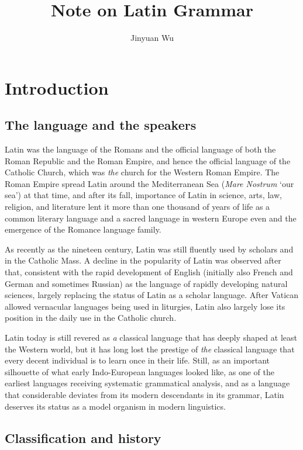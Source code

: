 \documentclass[a4paper, oneside, 12pt]{report}
\title{Note on Latin Grammar}
\author{Jinyuan Wu}
\newcommand{\form}[1]{\emph{#1}}
\newcommand{\translate}[1]{`#1'}
\begin{document}
\automath

\maketitle

\chapter{Introduction}

\section{The language and the speakers}

Latin was the language of the Romans
and the official language of both the Roman Republic and the Roman Empire,
and hence the official language of the Catholic Church, 
which was \emph{the} church for the Western Roman Empire. 
The Roman Empire spread Latin around the Mediterranean Sea (\form{Mare Nostrum} \translate{our sea}) at that time,
and after its fall, 
importance of Latin in science, arts, law, religion, and literature 
lent it more than one thousand of years of life 
as a common literary language and a sacred language in western Europe
even and the emergence of the Romance language family.

As recently as the nineteen century,
Latin was still fluently used by scholars and in the Catholic Mass. 
A decline in the popularity of Latin was observed after that,
consistent with the rapid development of English
(initially also French and German and sometimes Russian)
as the language of rapidly developing natural sciences,
largely replacing the status of Latin as a scholar language.
After Vatican allowed vernacular languages being used in liturgies, 
Latin also largely lose its position in the daily use in the Catholic church. 

Latin today is still revered as \emph{a} classical language
that has deeply shaped at least the Western world,
but it has long lost the prestige of \emph{the} classical language
that every decent individual is to learn once in their life.
Still, as an important silhouette of what early Indo-European languages looked like,
as one of the earliest languages receiving systematic grammatical analysis,
and as a language that considerable deviates from its modern descendants in its grammar,
Latin deserves its status as a model organism in modern linguistics.

\section{Classification and history}\label{sec:introduction.history}
\end{document}

